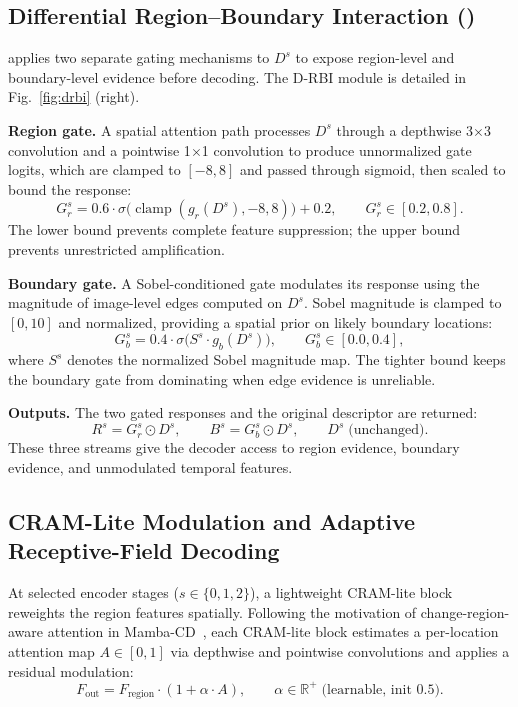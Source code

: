 \subsection{Differential Region--Boundary Interaction (\drbi)}
\label{sec:drbi}
\drbi{} applies two separate gating mechanisms to $D^s$ to expose region-level and boundary-level evidence before decoding. The D-RBI module is detailed in Fig.~\ref{fig:drbi} (right).

\textbf{Region gate.}  
A spatial attention path processes $D^s$ through a depthwise 3$\times$3 convolution and a pointwise 1$\times$1 convolution to produce unnormalized gate logits, which are clamped to $[-8, 8]$ and passed through sigmoid, then scaled to bound the response:
\begin{equation}
    G_r^s = 0.6\cdot\sigma\!\bigl(\operatorname{clamp}(g_r(D^s),{-8,8})\bigr) + 0.2,
    \qquad G_r^s \in [0.2, 0.8].
\end{equation}
The lower bound prevents complete feature suppression; the upper bound prevents unrestricted amplification.

\textbf{Boundary gate.}  
A Sobel-conditioned gate modulates its response using the magnitude of image-level edges computed on $D^s$. Sobel magnitude is clamped to $[0, 10]$ and normalized, providing a spatial prior on likely boundary locations:
\begin{equation}
    G_b^s = 0.4\cdot\sigma\!\bigl(S^s \cdot g_b(D^s)\bigr),
    \qquad G_b^s \in [0.0, 0.4],
\end{equation}
where $S^s$ denotes the normalized Sobel magnitude map. The tighter bound keeps the boundary gate from dominating when edge evidence is unreliable.

\textbf{Outputs.} The two gated responses and the original descriptor are returned:
\begin{equation}
    R^s = G_r^s \odot D^s, \qquad B^s = G_b^s \odot D^s, \qquad D^s\;\text{(unchanged)}.
\end{equation}
These three streams give the decoder access to region evidence, boundary evidence, and unmodulated temporal features.

\subsection{CRAM-Lite Modulation and Adaptive Receptive-Field Decoding}
\label{sec:decoder}
At selected encoder stages ($s \in \{0,1,2\}$), a lightweight CRAM-lite block reweights the region features spatially. Following the motivation of change-region-aware attention in Mamba-CD~\cite{peng2026mambacd}, each CRAM-lite block estimates a per-location attention map $A \in [0,1]$ via depthwise and pointwise convolutions and applies a residual modulation:
\begin{equation}
    F_{\mathrm{out}} = F_{\mathrm{region}} \cdot (1 + \alpha \cdot A), \qquad \alpha \in \mathbb{R}^+\;\text{(learnable, init 0.5)}.
\end{equation}

